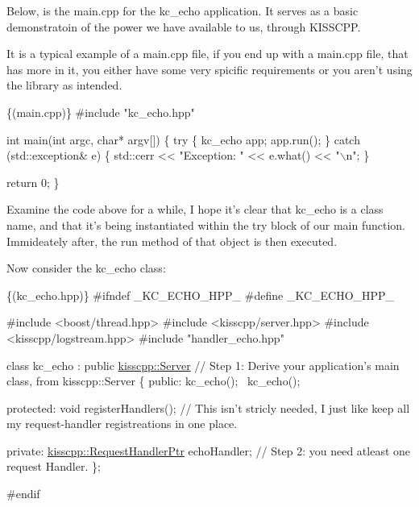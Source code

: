 Below, is the main.\-cpp for the kc\-\_\-echo application. It serves as a basic demonstratoin of the power we have available to us, through K\-I\-S\-S\-C\-P\-P.

It is a typical example of a main.\-cpp file, if you end up with a main.\-cpp file, that has more in it, you either have some very spicific requirements or you aren't using the library as intended.


\begin{DoxyCode}
\{(main.cpp)\}
#include \textcolor{stringliteral}{"kc\_echo.hpp"}

\textcolor{keywordtype}{int} main(\textcolor{keywordtype}{int} argc, \textcolor{keywordtype}{char}* argv[])
\{
  \textcolor{keywordflow}{try} \{
    kc\_echo app;
    app.run();
  \} \textcolor{keywordflow}{catch} (std::exception& e) \{
    std::cerr << \textcolor{stringliteral}{"Exception: "} << e.what() << \textcolor{stringliteral}{"\(\backslash\)n"};
  \}

  \textcolor{keywordflow}{return} 0;
\}
\end{DoxyCode}


Examine the code above for a while, I hope it's clear that kc\-\_\-echo is a class name, and that it's being instantiated within the try block of our main function. Immideately after, the run method of that object is then executed.

Now consider the kc\-\_\-echo class\-:


\begin{DoxyCode}
\{(kc\_echo.hpp)\}
#ifndef \_KC\_ECHO\_HPP\_
#define \_KC\_ECHO\_HPP\_

#include <boost/thread.hpp>
#include <kisscpp/server.hpp>
#include <kisscpp/logstream.hpp>
#include \textcolor{stringliteral}{"handler\_echo.hpp"}

\textcolor{keyword}{class} kc\_echo : \textcolor{keyword}{public} \hyperlink{classkisscpp_1_1_server}{kisscpp::Server}      \textcolor{comment}{// Step 1: Derive
       your application's main class, from kisscpp::Server}
\{
  \textcolor{keyword}{public}:
    kc\_echo();
    ~kc\_echo();

  \textcolor{keyword}{protected}:
    \textcolor{keywordtype}{void} registerHandlers();                \textcolor{comment}{// This isn't stricly needed, I
       just like keep all my request-handler registreations in one place.}

  \textcolor{keyword}{private}:
    \hyperlink{namespacekisscpp_a21e40edcd4f1a3c7c1cc0015b576c8e5}{kisscpp::RequestHandlerPtr} echoHandler; \textcolor{comment}{// Step
       2: you need atleast one request Handler.}
\};

\textcolor{preprocessor}{#endif}
\end{DoxyCode}


